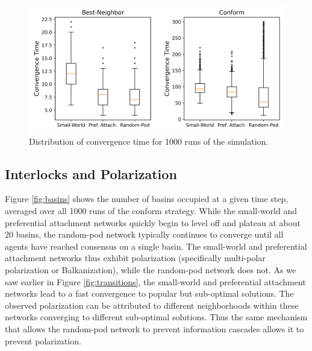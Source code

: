 \documentclass[manuscript,screen,review,acmsmall]{acmart}
\begin{document}
\begin{figure}
\begin{center}
\includegraphics[width=5in]{fig-netdelib-converge-net-boxplot.png}
\caption{Distribution of convergence time for 1000 runs of the simulation.}
\label{fig:convergence}
\end{center}
\end{figure}

\subsection{Interlocks and Polarization}
Figure \ref{fig:basins} shows the number of basins occupied at a given time
step, averaged over all 1000 runs of the conform strategy.
While the small-world and preferential attachment networks quickly begin to
level off and plateau at about 20 basins,
the random-pod network typically continues to converge until all agents have reached consensus on a single basin.
The small-world and preferential attachment networks thus exhibit polarization
(specifically multi-polar polarization or Balkanization),
while the random-pod network does not.
As we saw earlier in Figure \ref{fig:transitions},
the small-world and preferential attachment networks lead to a fast convergence to popular but sub-optimal solutions.
The observed polarization can be attributed to different neighborhoods within these networks converging to different sub-optimal solutions.
Thus the same mechanism that allows the random-pod network to prevent information cascades allows it to prevent polarization.
\end{document}

